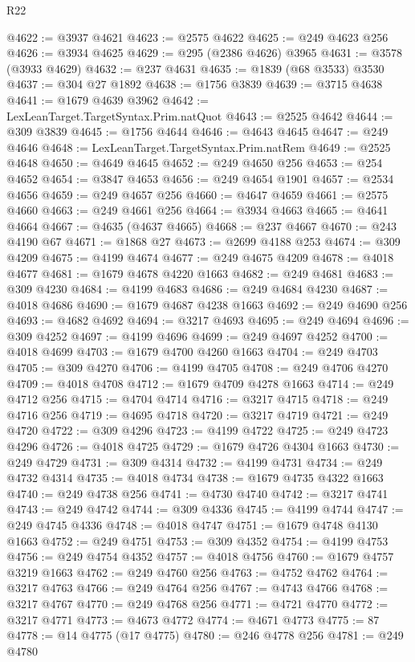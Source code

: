 \begin{lexlean}{R22}
\begin{coremodule}
@4622 := @3937 @4621
@4623 := @2575 @4622
@4625 := @249 @4623 @256
@4626 := @3934 @4625
@4629 := @295 (@2386 @4626) @3965
@4631 := @3578 (@3933 @4629)
@4632 := @237 @4631
@4635 := @1839 (@68 @3533) @3530
@4637 := @304 @27 @1892
@4638 := @1756 @3839
@4639 := @3715 @4638
@4641 := @1679 @4639 @3962
@4642 := LexLeanTarget.TargetSyntax.Prim.natQuot
@4643 := @2525 @4642
@4644 := @309 @3839
@4645 := @1756 @4644
@4646 := @4643 @4645
@4647 := @249 @4646
@4648 := LexLeanTarget.TargetSyntax.Prim.natRem
@4649 := @2525 @4648
@4650 := @4649 @4645
@4652 := @249 @4650 @256
@4653 := @254 @4652
@4654 := @3847 @4653
@4656 := @249 @4654 @1901
@4657 := @2534 @4656
@4659 := @249 @4657 @256
@4660 := @4647 @4659
@4661 := @2575 @4660
@4663 := @249 @4661 @256
@4664 := @3934 @4663
@4665 := @4641 @4664
@4667 := @4635 (@4637 @4665)
@4668 := @237 @4667
@4670 := @243 @4190 @67
@4671 := @1868 @27
@4673 := @2699 @4188 @253
@4674 := @309 @4209
@4675 := @4199 @4674
@4677 := @249 @4675 @4209
@4678 := @4018 @4677
@4681 := @1679 @4678 @4220 @1663
@4682 := @249 @4681
@4683 := @309 @4230
@4684 := @4199 @4683
@4686 := @249 @4684 @4230
@4687 := @4018 @4686
@4690 := @1679 @4687 @4238 @1663
@4692 := @249 @4690 @256
@4693 := @4682 @4692
@4694 := @3217 @4693
@4695 := @249 @4694
@4696 := @309 @4252
@4697 := @4199 @4696
@4699 := @249 @4697 @4252
@4700 := @4018 @4699
@4703 := @1679 @4700 @4260 @1663
@4704 := @249 @4703
@4705 := @309 @4270
@4706 := @4199 @4705
@4708 := @249 @4706 @4270
@4709 := @4018 @4708
@4712 := @1679 @4709 @4278 @1663
@4714 := @249 @4712 @256
@4715 := @4704 @4714
@4716 := @3217 @4715
@4718 := @249 @4716 @256
@4719 := @4695 @4718
@4720 := @3217 @4719
@4721 := @249 @4720
@4722 := @309 @4296
@4723 := @4199 @4722
@4725 := @249 @4723 @4296
@4726 := @4018 @4725
@4729 := @1679 @4726 @4304 @1663
@4730 := @249 @4729
@4731 := @309 @4314
@4732 := @4199 @4731
@4734 := @249 @4732 @4314
@4735 := @4018 @4734
@4738 := @1679 @4735 @4322 @1663
@4740 := @249 @4738 @256
@4741 := @4730 @4740
@4742 := @3217 @4741
@4743 := @249 @4742
@4744 := @309 @4336
@4745 := @4199 @4744
@4747 := @249 @4745 @4336
@4748 := @4018 @4747
@4751 := @1679 @4748 @4130 @1663
@4752 := @249 @4751
@4753 := @309 @4352
@4754 := @4199 @4753
@4756 := @249 @4754 @4352
@4757 := @4018 @4756
@4760 := @1679 @4757 @3219 @1663
@4762 := @249 @4760 @256
@4763 := @4752 @4762
@4764 := @3217 @4763
@4766 := @249 @4764 @256
@4767 := @4743 @4766
@4768 := @3217 @4767
@4770 := @249 @4768 @256
@4771 := @4721 @4770
@4772 := @3217 @4771
@4773 := @4673 @4772
@4774 := @4671 @4773
@4775 := 87
@4778 := @14 @4775 (@17 @4775)
@4780 := @246 @4778 @256
@4781 := @249 @4780

\end{coremodule}
\end{lexlean}
